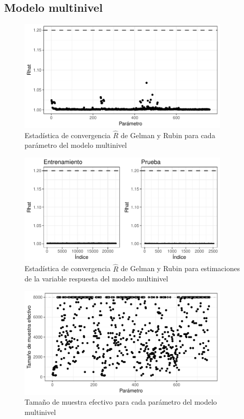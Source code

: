 \subsection*{Modelo multinivel}

\begin{figure}[H]
    \centering
    \includegraphics[width=0.9\textwidth]{images/three_levels_r_statistic_params.pdf}
    \caption{Estadística de convergencia $\hat{R}$ de Gelman y Rubin para cada parámetro del modelo multinivel}
    \label{fig:three_levels_r_statistic_params}
\end{figure}

\begin{figure}[H]
    \centering
    \includegraphics[width=0.9\textwidth]{images/three_levels_r_statistic_yf.pdf}
    \caption{Estadística de convergencia $\hat{R}$ de Gelman y Rubin para estimaciones de la variable respuesta del modelo multinivel}
    \label{fig:three_levels_r_statistic_yf}
\end{figure}

\begin{figure}[H]
    \centering
    \includegraphics[width=0.9\textwidth]{images/three_levels_n_eff_params.pdf}
    \caption{Tamaño de muestra efectivo para cada parámetro del modelo multinivel}
    \label{fig:three_levels_n_eff_params}
\end{figure}

